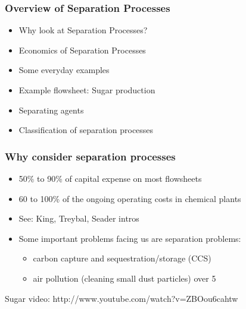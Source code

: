 
\begin{frame}\frametitle{Overview of Separation Processes}
	
	\begin{itemize}
		\item	Why look at Separation Processes?
		\item	Economics of Separation Processes
		\item	Some everyday examples
		\item	Example flowsheet: Sugar production
		\item	Separating agents
		\item	Classification of separation processes		
	\end{itemize}
\end{frame}

\begin{frame}\frametitle{Why consider separation processes}
	\begin{itemize}
		\item	50\% to 90\% of capital expense on most flowsheets
		\item	60 to 100\% of the ongoing operating costs in chemical plants
		\item	See: King, Treybal, Seader intros
		\item	Some important problems facing us are separation problems:
		\begin{itemize}
			\item	carbon capture and sequestration/storage (CCS)
			\item	air pollution (cleaning small dust particles) over 5\micron
			
		\end{itemize}
		
	\end{itemize}
\end{frame}

Sugar video: http://www.youtube.com/watch?v=ZBOou6cahtw



